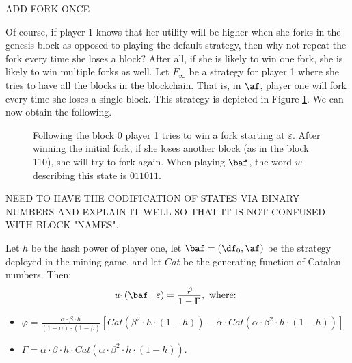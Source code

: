 ADD FORK ONCE

Of course, if player 1 knows that her utility will be higher when she forks in the genesis block as opposed to playing the default strategy, then why not repeat the fork every time she loses a block? After all, if she is likely to win one fork, she is likely to win multiple forks as well. Let $F_\infty$ be a strategy for player 1 where she tries to have all the blocks in the blockchain. That is, in $\af$, player one will fork every time she loses a single block. This strategy is depicted in Figure \ref{fig:always_fork}. We can now obtain the following.

\begin{figure}
\begin{center}
\end{center}
\caption{Following the block 0 player 1 tries to win a fork starting at $\varepsilon$. After winning the initial fork, if she loses another block (as in the block 110), she will try to fork again. When playing $\baf$, the word $w$ describing this state is $011011$.}
\label{fig:always_fork}
\end{figure}

NEED TO HAVE THE CODIFICATION OF STATES VIA BINARY NUMBERS AND EXPLAIN IT WELL SO THAT IT IS NOT CONFUSED WITH BLOCK "NAMES".

\begin{theorem}\label{thm:always_fork}
Let $h$ be the hash power of player one, let $\baf=(\df_0,\af)$ be the strategy deployed in the mining game, and let $Cat$ be the generating function of Catalan numbers. Then:
$$u_1(\baf\mid\varepsilon) = \frac{\varphi}{1-\Gamma}, \text{ where: }$$
\begin{itemize}
\item $\varphi = \frac{\alpha \cdot \beta \cdot h }{(1-\alpha)\cdot (1-\beta)}[Cat(\beta^2 \cdot h \cdot (1-h))-\alpha\cdot Cat(\alpha\cdot \beta^2 \cdot h \cdot (1-h))]$
\item $\Gamma = \alpha \cdot \beta \cdot h \cdot Cat(\alpha\cdot \beta^2 \cdot h \cdot (1-h))$.
\end{itemize}
\end{theorem}

